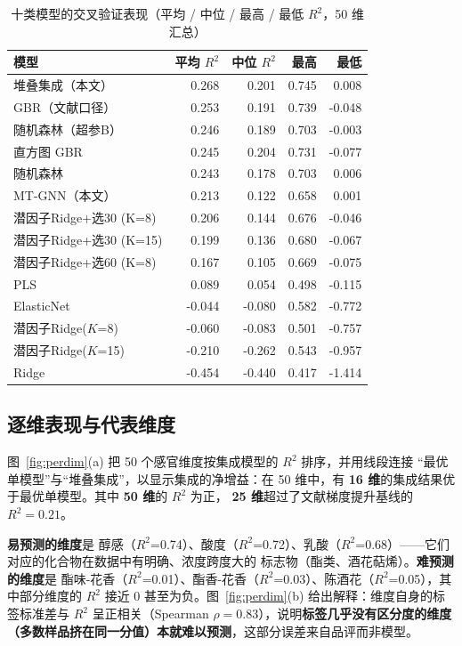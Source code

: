 \begin{table}[H]
\centering
\caption{十类模型的交叉验证表现（平均 / 中位 / 最高 / 最低 $R^2$，50 维汇总）}
\label{tab:q1cv}
\small
\begin{fittable}
\begin{tabular}{@{}lrrrr@{}}
\toprule
模型 & 平均 $R^2$ & 中位 $R^2$ & 最高 & 最低 \\
\midrule
堆叠集成（本文） & 0.268 & 0.201 & 0.745 & 0.008 \\
GBR（文献口径） & 0.253 & 0.191 & 0.739 & -0.048 \\
随机森林（超参B） & 0.246 & 0.189 & 0.703 & -0.003 \\
直方图 GBR & 0.245 & 0.204 & 0.731 & -0.077 \\
随机森林 & 0.243 & 0.178 & 0.703 & 0.006 \\
MT-GNN（本文） & 0.213 & 0.122 & 0.658 & 0.001 \\
潜因子Ridge+选30 (K=8) & 0.206 & 0.144 & 0.676 & -0.046 \\
潜因子Ridge+选30 (K=15) & 0.199 & 0.136 & 0.680 & -0.067 \\
潜因子Ridge+选60 (K=8) & 0.167 & 0.105 & 0.669 & -0.075 \\
PLS & 0.089 & 0.054 & 0.498 & -0.115 \\
ElasticNet & -0.044 & -0.080 & 0.582 & -0.772 \\
潜因子Ridge($K$=8) & -0.060 & -0.083 & 0.501 & -0.757 \\
潜因子Ridge($K$=15) & -0.210 & -0.262 & 0.543 & -0.957 \\
Ridge & -0.454 & -0.440 & 0.417 & -1.414 \\
\bottomrule
\end{tabular}
\end{fittable}
\end{table}

\subsection{逐维表现与代表维度}

图~\ref{fig:perdim}(a) 把 50 个感官维度按集成模型的 $R^2$ 排序，并用线段连接
“最优单模型”与“堆叠集成”，以显示集成的净增益：在 50 维中，有
\textbf{16 维}的集成结果优于最优单模型。其中 \textbf{50 维}的 $R^2$ 为正，
\textbf{25 维}超过了文献梯度提升基线的 $R^2=0.21$。

\textbf{易预测的维度}是 醇感（$R^2$=0.74）、酸度（$R^2$=0.72）、乳酸（$R^2$=0.68）——它们对应的化合物在数据中有明确、浓度跨度大的
标志物（酯类、酒花萜烯）。\textbf{难预测的维度}是 酯味-花香（$R^2$=0.01）、酯香-花香（$R^2$=0.03）、陈酒花（$R^2$=0.05），其中部分维度的 $R^2$
接近 0 甚至为负。图~\ref{fig:perdim}(b) 给出解释：维度自身的标签标准差与
$R^2$ 呈正相关（Spearman $\rho=0.83$），说明\textbf{标签几乎没有区分度的维度
（多数样品挤在同一分值）本就难以预测}，这部分误差来自品评而非模型。

